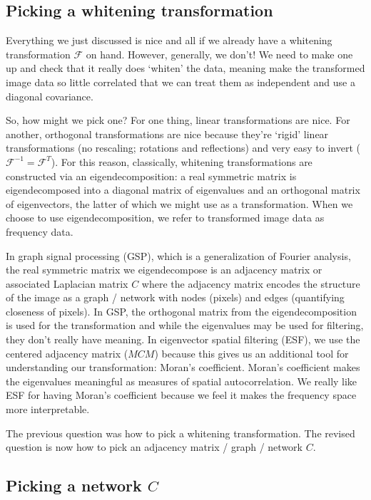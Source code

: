 \documentclass[12pt]{article}
\begin{document}
\subsection*{Picking a whitening transformation}

Everything we just discussed is nice and all if we already have a whitening transformation $\mathcal F$ on hand. However, generally, we don't! We need to make one up and check that it really does `whiten' the data, meaning make the transformed image data so little correlated that we can treat them as independent and use a diagonal covariance.

So, how might we pick one? For one thing, linear transformations are nice. For another, orthogonal transformations are nice because they're `rigid' linear transformations (no rescaling; rotations and reflections) and very easy to invert ($\mathcal F^{-1}=\mathcal F^T$). For this reason, classically, whitening transformations are constructed via an eigendecomposition: a real symmetric matrix is eigendecomposed into a diagonal matrix of eigenvalues and an orthogonal matrix of eigenvectors, the latter of which we might use as a transformation. When we choose to use eigendecomposition, we refer to transformed image data as frequency data.

In graph signal processing (GSP), which is a generalization of Fourier analysis, the real symmetric matrix we eigendecompose is an adjacency matrix or associated Laplacian matrix $C$ where the adjacency matrix encodes the structure of the image as a graph / network with nodes (pixels) and edges (quantifying closeness of pixels). In GSP, the orthogonal matrix from the eigendecomposition is used for the transformation and while the eigenvalues may be used for filtering, they don't really have meaning. In eigenvector spatial filtering (ESF), we use the centered adjacency matrix ($MCM$) because this gives us an additional tool for understanding our transformation: Moran's coefficient. Moran's coefficient makes the eigenvalues meaningful as measures of spatial autocorrelation. We really like ESF for having Moran's coefficient because we feel it makes the frequency space more interpretable.

The previous question was how to pick a whitening transformation. The revised question is now how to pick an adjacency matrix / graph / network $C$.

\subsection*{Picking a network $C$}
\end{document}
